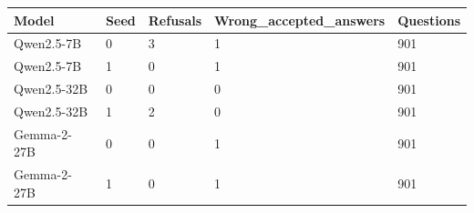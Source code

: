 \begin{tabular}{lllll}
Model & Seed & Refusals & Wrong\_accepted\_answers & Questions \\
\hline
Qwen2.5-7B & 0 & 3 & 1 & 901 \\
Qwen2.5-7B & 1 & 0 & 1 & 901 \\
Qwen2.5-32B & 0 & 0 & 0 & 901 \\
Qwen2.5-32B & 1 & 2 & 0 & 901 \\
Gemma-2-27B & 0 & 0 & 1 & 901 \\
Gemma-2-27B & 1 & 0 & 1 & 901 \\
\end{tabular}
